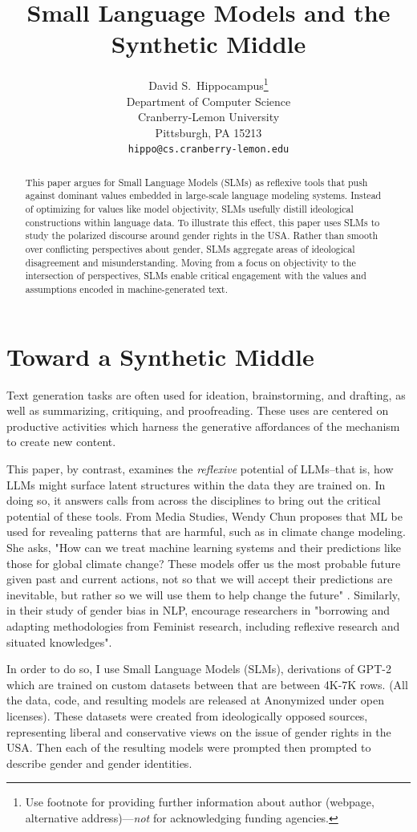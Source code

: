 \documentclass{article}
\title{Small Language Models and the Synthetic Middle}
\author{%
  David S.~Hippocampus\thanks{Use footnote for providing further information
    about author (webpage, alternative address)---\emph{not} for acknowledging
    funding agencies.} \\
  Department of Computer Science\\
  Cranberry-Lemon University\\
  Pittsburgh, PA 15213 \\
  \texttt{hippo@cs.cranberry-lemon.edu} \\
}
\begin{document}
\maketitle


\begin{abstract}
This paper argues for Small Language Models (SLMs) as reflexive tools that push against dominant values embedded in large-scale language modeling systems. Instead of optimizing for values like model objectivity, SLMs usefully distill ideological constructions within language data. To illustrate this effect, this paper uses SLMs to study the polarized discourse around gender rights in the USA. Rather than smooth over conflicting perspectives about gender, SLMs aggregate areas of ideological disagreement and misunderstanding. Moving from a focus on objectivity to the intersection of perspectives, SLMs enable critical engagement with the values and assumptions encoded in machine-generated text.
\end{abstract}

\section{Toward a Synthetic Middle}

Text generation tasks are often used for ideation, brainstorming, and drafting, as well as summarizing, critiquing, and proofreading. These uses are centered on productive activities which harness the generative affordances of the mechanism to create new content.

This paper, by contrast, examines the \textit{reflexive} potential of LLMs--that is, how LLMs might surface latent structures within the data they are trained on. In doing so, it answers calls from across the disciplines to bring out the critical potential of these tools. From Media Studies, Wendy Chun proposes that ML be used for revealing patterns that are harmful, such as in climate change modeling. She asks, "How can we treat machine learning systems and their predictions like those for global climate change? These models offer us the most probable future given past and current actions, not so that we will accept their predictions are inevitable, but rather so we will use them to help change the future" \citep{chun_2021}. Similarly, in their study of gender bias in NLP, \citet{devinney_2022} encourage researchers in "borrowing and adapting methodologies from Feminist research, including reflexive research and situated knowledges".

In order to do so, I use Small Language Models (SLMs), derivations of GPT-2 which are trained on custom datasets between that are between 4K-7K rows. (All the data, code, and resulting models are released at Anonymized under open licenses). These datasets were created from ideologically opposed sources, representing liberal and conservative views on the issue of gender rights in the USA. Then each of the resulting models were prompted then prompted to describe gender and gender identities.
\end{document}
